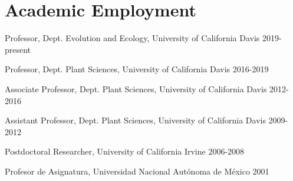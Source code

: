 \documentclass[letterpaper,10pt]{article}
\renewenvironment{itemize}{
  \begin{list}{}{
    \setlength{\leftmargin}{1.5em}
  }
}{
  \end{list}
}
\begin{document}
\section*{Academic Employment}
\begin{itemize}
\setlength\itemsep{0ex}
\item Professor, Dept. Evolution and Ecology, University of California Davis 2019-present
\item Professor, Dept. Plant Sciences, University of California Davis 2016-2019
\item Associate Professor, Dept. Plant Sciences, University of California Davis 2012-2016
\item Assistant Professor, Dept. Plant Sciences, University of California Davis 2009-2012
\item Postdoctoral Researcher, University of California Irvine 2006-2008
\item Profesor de Asignatura, Universidad Nacional Aut\'{o}noma de M\'{e}xico 2001
\end{itemize}

\end{document}
